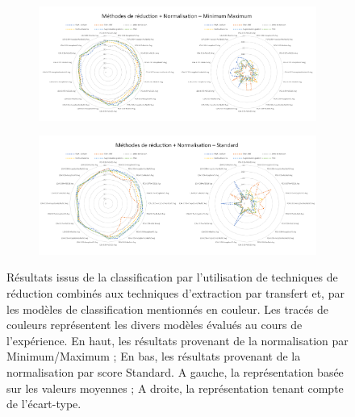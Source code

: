 \begin{figure}[H]
    \centering
    
    \begin{subfigure}{\textwidth}
      \includegraphics[width=\textwidth]{contents/chapter_5/resources/results_image_classification_reduction_mms.pdf}
    \end{subfigure}
    
    \begin{subfigure}{\textwidth}
      \includegraphics[width=\textwidth]{contents/chapter_5/resources/results_image_classification_reduction_ss.pdf}
    \end{subfigure}
    
    \caption{Résultats issus de la classification par l'utilisation de techniques de réduction combinés aux techniques d'extraction par transfert et, par les modèles de classification mentionnés en couleur. Les tracés de couleurs représentent les divers modèles évalués au cours de l'expérience. En haut, les résultats provenant de la normalisation par Minimum/Maximum ; En bas, les résultats provenant de la normalisation par score Standard. A gauche, la représentation basée sur les valeurs moyennes ; A droite, la représentation tenant compte de l'écart-type.}
    \label{fig:results_image_classification_reduction}
\end{figure}\par


